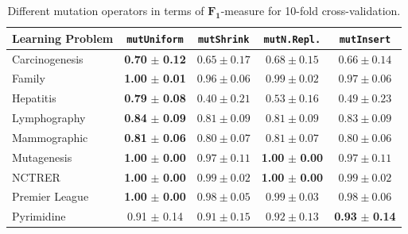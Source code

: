 \begin{table}[tbp]
    \centering
	\caption{Different mutation operators in terms of $\boldsymbol{F_1}$-mea\-sure for 10-fold cross-validation.}%
	\label{tab:mutation}
	\setlength{\tabcolsep}{6pt}
	\footnotesize
	\begin{tabular}{@{}lcccc@{}}
			\toprule
			\textbf{Learning Problem} & \textbf{\texttt{mutUniform}} & \textbf{\texttt{mutShrink}} &
			\textbf{\texttt{mutN.Repl.}} & \textbf{\texttt{mutInsert}} \\
			\midrule
			Carcinogenesis & \textbf{0.70} $\boldsymbol{\pm}$ \textbf{0.12} & $0.65 \pm 0.17$& $0.68 \pm 0.15$& $0.66 \pm 0.14$ \\
			 
			Family & \textbf{1.00} $\boldsymbol{\pm}$ \textbf{0.01} & $0.96 \pm 0.06$ & $0.99 \pm 0.02$& $0.97 \pm 0.06$\\
			
			Hepatitis & \textbf{0.79} $\boldsymbol{\pm}$ \textbf{0.08} & $0.40 \pm 0.21$& $0.53 \pm 0.16$& $0.49 \pm 0.23$\\
			
			Lymphography & \textbf{0.84} $\boldsymbol{\pm}$ \textbf{0.09} & $0.81 \pm 0.09$ & $0.81 \pm 0.09$ & $0.83 \pm 0.09$\\
			
			Mammographic & \textbf{0.81} $\boldsymbol{\pm}$ \textbf{0.06} & $0.80 \pm 0.07$& $0.81 \pm 0.07$& $0.80 \pm 0.06$\\
			 
			Mutagenesis & \textbf{1.00} $\boldsymbol{\pm}$ \textbf{0.00} & $0.97 \pm 0.11$ & \textbf{1.00} $\boldsymbol{\pm}$ \textbf{0.00} & $0.97 \pm 0.11$ \\
			
			NCTRER & \textbf{1.00} $\boldsymbol{\pm}$ \textbf{0.00} & $0.99 \pm 0.02$ & \textbf{1.00} $\boldsymbol{\pm}$ \textbf{0.00} & $0.99 \pm 0.02$\\
			
			Premier League & \textbf{1.00} $\boldsymbol{\pm}$ \textbf{0.00}& $0.98 \pm 0.05$ & $0.99 \pm 0.03$ & $0.98 \pm 0.06$ \\
			
			Pyrimidine & 0.91 $\pm$ 0.14 & $0.91 \pm 0.15$& $0.92 \pm 0.13$ & \textbf{0.93} $\boldsymbol{\pm}$ \textbf{0.14}\\
			
			\bottomrule
	\end{tabular}
\end{table}
